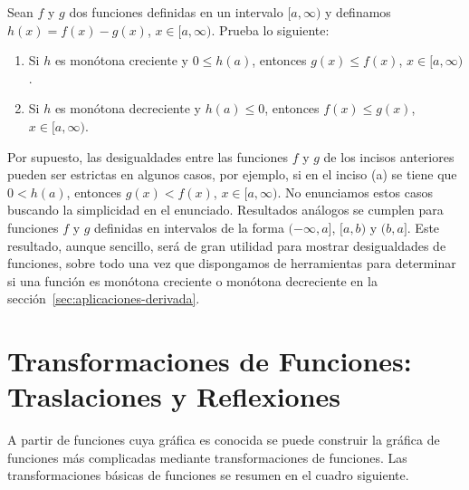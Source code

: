 \documentclass[12pt,a4paper]{book}
\begin{document}
    \begin{ejercicio}\label{ej:108}
        Sean $f$ y $g$ dos funciones
        definidas en un intervalo $[a,\infty)$ y definamos $h(x)=f(x)-g(x)$, $x\in[a,\infty)$.
        Prueba lo siguiente:
        \begin{enumerate}[nosep]
            \item Si $h$ es monótona creciente y $0\leq h(a)$, entonces $g(x)\leq f(x)$, $x\in[a,\infty)$.
            \item Si $h$ es monótona decreciente y $h(a)\leq 0$, entonces $f(x)\leq g(x)$, $x\in[a,\infty)$.
        \end{enumerate}
        Por supuesto, las desigualdades entre las funciones $f$ y $g$ de los incisos anteriores
        pueden ser estrictas en algunos casos, por ejemplo, si en el inciso (a) se
        tiene que $0<h(a)$, entonces $g(x)<f(x)$, $x\in[a,\infty)$. No enunciamos estos
        casos buscando la simplicidad en el enunciado. Resultados análogos se cumplen
        para funciones $f$ y $g$ definidas en intervalos de la forma $(-\infty,a]$, $[a,b)$
        y $(b,a]$. Este resultado, aunque sencillo, será de gran utilidad para mostrar
        desigualdades de funciones, sobre todo una vez que dispongamos de herramientas
        para determinar si una función es monótona creciente o monótona
        decreciente en la sección~\ref{sec:aplicaciones-derivada}.
    \end{ejercicio}

    \section{Transformaciones de Funciones: Traslaciones y Reflexiones}

    A partir de funciones cuya gráfica es conocida se puede construir la gráfica
    de funciones más complicadas mediante transformaciones de funciones. Las
    transformaciones básicas de funciones se resumen en el cuadro siguiente.
\end{document}
